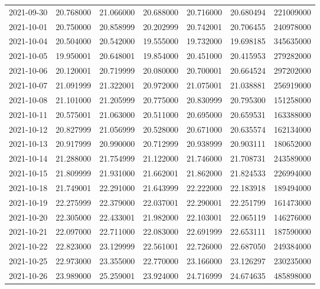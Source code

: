 \begin{tabular}{lrrrrrr}
2021-09-30 &   20.768000 &   21.066000 &   20.688000 &   20.716000 &   20.680494 &   221009000 \\
2021-10-01 &   20.750000 &   20.858999 &   20.202999 &   20.742001 &   20.706455 &   240978000 \\
2021-10-04 &   20.504000 &   20.542000 &   19.555000 &   19.732000 &   19.698185 &   345635000 \\
2021-10-05 &   19.950001 &   20.648001 &   19.854000 &   20.451000 &   20.415953 &   279282000 \\
2021-10-06 &   20.120001 &   20.719999 &   20.080000 &   20.700001 &   20.664524 &   297202000 \\
2021-10-07 &   21.091999 &   21.322001 &   20.972000 &   21.075001 &   21.038881 &   256919000 \\
2021-10-08 &   21.101000 &   21.205999 &   20.775000 &   20.830999 &   20.795300 &   151258000 \\
2021-10-11 &   20.575001 &   21.063000 &   20.511000 &   20.695000 &   20.659531 &   163388000 \\
2021-10-12 &   20.827999 &   21.056999 &   20.528000 &   20.671000 &   20.635574 &   162134000 \\
2021-10-13 &   20.917999 &   20.990000 &   20.712999 &   20.938999 &   20.903111 &   180652000 \\
2021-10-14 &   21.288000 &   21.754999 &   21.122000 &   21.746000 &   21.708731 &   243589000 \\
2021-10-15 &   21.809999 &   21.931000 &   21.662001 &   21.862000 &   21.824533 &   226994000 \\
2021-10-18 &   21.749001 &   22.291000 &   21.643999 &   22.222000 &   22.183918 &   189494000 \\
2021-10-19 &   22.275999 &   22.379000 &   22.037001 &   22.290001 &   22.251799 &   161473000 \\
2021-10-20 &   22.305000 &   22.433001 &   21.982000 &   22.103001 &   22.065119 &   146276000 \\
2021-10-21 &   22.097000 &   22.711000 &   22.083000 &   22.691999 &   22.653111 &   187590000 \\
2021-10-22 &   22.823000 &   23.129999 &   22.561001 &   22.726000 &   22.687050 &   249384000 \\
2021-10-25 &   22.973000 &   23.355000 &   22.770000 &   23.166000 &   23.126297 &   230235000 \\
2021-10-26 &   23.989000 &   25.259001 &   23.924000 &   24.716999 &   24.674635 &   485898000 \\

\end{tabular}
